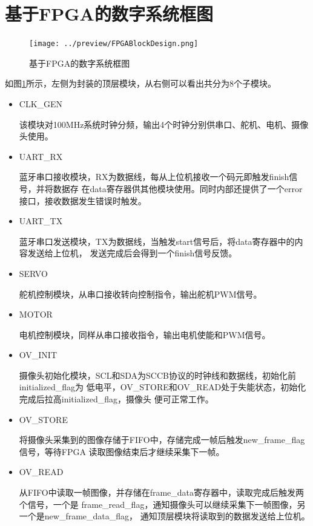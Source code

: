 \documentclass[a4paper]{paper}
\begin{document}
\section{基于FPGA的数字系统框图}
\begin{figure}
    \centering
    \texttt{[image: ../preview/FPGABlockDesign.png]}
    \caption{基于FPGA的数字系统框图}
    \label{FPGABlockDesign}
\end{figure}
如图\ref{FPGABlockDesign}所示，左侧为封装的顶层模块，从右侧可以看出共分为8个子模块。
\begin{itemize}
    \item CLK\_GEN

    该模块对100MHz系统时钟分频，输出4个时钟分别供串口、舵机、电机、摄像头使用。

    \item UART\_RX

    蓝牙串口接收模块，RX为数据线，每从上位机接收一个码元即触发finish信号，并将数据存
    在data寄存器供其他模块使用。同时内部还提供了一个error接口，接收数据发生错误时触发。

    \item UART\_TX

    蓝牙串口发送模块，TX为数据线，当触发start信号后，将data寄存器中的内容发送给上位机，
    发送完成后会得到一个finish信号反馈。

    \item SERVO

    舵机控制模块，从串口接收转向控制指令，输出舵机PWM信号。

    \item MOTOR

    电机控制模块，同样从串口接收指令，输出电机使能和PWM信号。

    \item OV\_INIT

    摄像头初始化模块，SCL和SDA为SCCB协议的时钟线和数据线，初始化前initialized\_flag为
    低电平，OV\_STORE和OV\_READ处于失能状态，初始化完成后拉高initialized\_flag，摄像头
    便可正常工作。

    \item OV\_STORE

    将摄像头采集到的图像存储于FIFO中，存储完成一帧后触发new\_frame\_flag信号，等待FPGA
    读取图像结束后才继续采集下一帧。

    \item OV\_READ

    从FIFO中读取一帧图像，并存储在frame\_data寄存器中，读取完成后触发两个信号，一个是
    frame\_read\_flag，通知摄像头可以继续采集下一帧图像，另一个是new\_frame\_data\_flag，
    通知顶层模块将读取到的数据发送给上位机。
    
\end{itemize}
\end{document}
